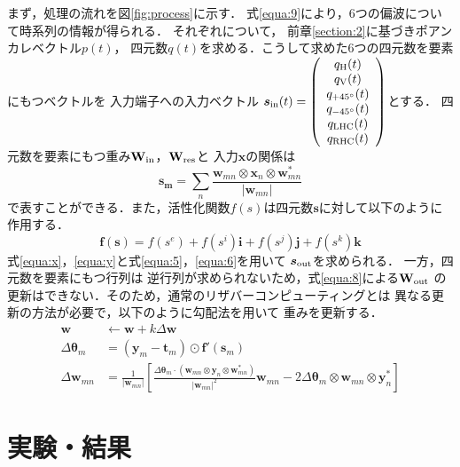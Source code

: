 \documentclass[uplatex,a4paper,12pt]{jsarticle}
\begin{document}
まず，処理の流れを図\ref{fig:process}に示す．
式\ref{equa:9}により，6つの偏波について時系列の情報が得られる．
それぞれについて，
前章\ref{section:2}に基づきポアンカレベクトル$p(t)$，
四元数$q(t)$を求める．こうして求めた6つの四元数を要素にもつベクトルを
入力端子への入力ベクトル
$\bm{s}_{\rm{in}}(t) = 
\left(
    \begin{array}{c}
        q_{\rm{H}}(t)\\
        q_{\rm{V}}(t)\\
        q_{+45^\circ}(t)\\
        q_{-45^\circ}(t)\\
        q_{\rm{LHC}}(t)\\
        q_{\rm{RHC}}(t)
    \end{array}
\right)$とする．
四元数を要素にもつ重み$\bf{W_{\rm{in}}}$，$\bf{W_{\rm{res}}}$と
入力$\bm{x}$の関係は
\begin{equation}\label{equa:x}
    \bm{s_m} =  \sum_{n} \frac{\bm{w}_{mn}\otimes \bm{x}_n\otimes \bm{w}_{mn}^{*}}{|\bm{w}_{mn}|}
\end{equation}
で表すことができる．また，活性化関数$f(s)$は四元数$\bm{s}$に対して以下のように作用する．
\begin{equation}\label{equa:y}
    \bm{f}(\bm{s})= f(s^e) + f(s^i)\bm{i} + f(s^j)\bm{j} + f(s^k)\bm{k}
\end{equation}
式\ref{equa:x}，\ref{equa:y}と式\ref{equa:5}，\ref{equa:6}を用いて
$\bm{s}_{\rm{out}}$を求められる．
一方，四元数を要素にもつ行列は
逆行列が求められないため，式\ref{equa:8}による$\bf{W_{\rm{out}}}$
の更新はできない．そのため，通常のリザバーコンピューティングとは
異なる更新の方法が必要で，以下のように勾配法を用いて
重みを更新する\cite{quaternion1}\cite{quaternion2}．
\begin{align}
    \bm{w} &\leftarrow \bm{w}+k\Delta \bm{w}\\
    \Delta \bm{\theta}_m &= 
    (\bm{y}_m - \bm{t}_m)\odot \bm{f'}(\bm{s}_m)\\
    \Delta \bm{w}_{mn} &= 
    \frac{1}{|\bm{w}_{mn}|}
    \left[\frac{\Delta\bm{\theta}_m\cdot
    (\bm{w}_{mn}\otimes\bm{y}_{n}\otimes
    \bm{w}_{mn}^{*})}{|\bm{w}_{mn}|^2}\bm{w}_{mn}
    -2\Delta\bm{\theta}_{m}\otimes\bm{w}_{mn}
    \otimes\bm{y}_{n}^{*}\right]
\end{align}




\section{実験・結果}
\end{document}
